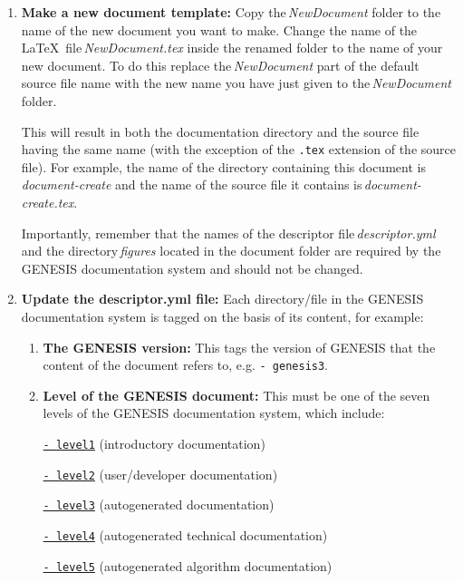 \documentclass[12pt]{article}
\begin{document}
\begin{enumerate}

\item {\bf Make a new document template:} Copy the\,{\it NewDocument} folder to the name of the new document you want to make. Change the name of the \LaTeX\,\,\,file\,{\it NewDocument.tex} inside the renamed folder to the name of your new document. To do this replace the\,{\it NewDocument} part of the default source file name with the new name you have just given to the\,{\it NewDocument} folder.

This will result in both the documentation directory and the source file having the same name (with the exception of the {\tt .tex} extension of the source file). For example, the name of the directory containing this document is {\it document-create} and the name of the source file it contains is\,{\it document-create.tex}.

Importantly, remember that the names of the descriptor file\,{\it descriptor.yml} and the directory\,{\it figures} located in the document folder are required by the GENESIS documentation system and should not be changed.

\item {\bf Update the descriptor.yml file:} Each directory/file in the GENESIS documentation system is tagged on the basis of its content, for example:

\begin{enumerate}

\item  {\bf The GENESIS version:} This tags the version of GENESIS that the content of the document refers to, e.g. {\tt -\,genesis3}.

\item {\bf Level of the GENESIS document:} This must be one of the seven levels of the GENESIS documentation system, which include:

\href{../contents-level1/contents-level1.tex}{{\tt - level1}} (introductory documentation)

\href{../contents-level2/contents-level2.tex}{{\tt - level2}} (user/developer documentation)

\href{../contents-level3/contents-level3.tex}{{\tt - level3}} (autogenerated documentation)

\href{../contents-level4/contents-level4.tex}{{\tt - level4}} (autogenerated technical documentation)

\href{../contents-level5/contents-level5.tex}{{\tt - level5}} (autogenerated algorithm documentation)


\end{enumerate}
\end{enumerate}
\end{document}
